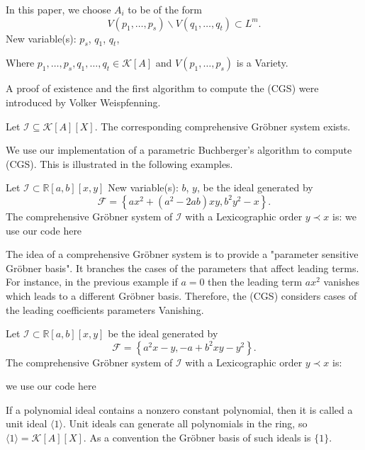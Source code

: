 \documentclass[runningheads]{llncs}
\newcommand{\1}{\chi}
\begin{document}
In this paper, we choose \(A_i\) to be of the form 
\[V(p_1,\dots,p_s)\backslash V(q_1,\dots,q_t) \subset L^m.\]
{\color{blue} New variable(s): \(p_s\), \(q_1\), \(q_t\),  }

Where \(p_1,\dots,p_s,q_1,\dots,q_t\in \mathcal{K}[A]\) and \(V(p_1,\dots,p_s)\) is a Variety.

A proof of existence and the first algorithm to compute the (CGS) were introduced by Volker Weispfenning.
\begin{theorem}
    Let \(\mathcal{I}\subseteq\mathcal{K}[A][X].\) The corresponding comprehensive Gr{\"o}bner system exists.\cite{weispfenning}
\end{theorem}
We use our implementation of a parametric Buchberger's algorithm to compute (CGS). 
This is illustrated in the following examples.
\begin{example}
    Let \(\mathcal{I}\subset \mathbb{R}[a,b][x,y]\)
{\color{blue} New variable(s): \(b\), \(y\),  }
 be the ideal generated by 
    \[\mathcal{F}=\left\{a x^2+\left(a^2-2 a b\right) x y, b^2 y^2-x\right\}.\]
    The comprehensive Gr{\"o}bner system of \(\mathcal{I}\) with a Lexicographic order \(y\prec x\) is:
    {\color{red} we use our code here}
\end{example}
The idea of a comprehensive Gr{\"o}bner system is to provide a "parameter sensitive Gr{\"o}bner basis".
It branches the cases of the parameters that affect leading terms. For instance, in the previous
example if \(a=0\) then the leading term \(a x^2\) vanishes which leads to a different Gr{\"o}bner basis. Therefore,
the (CGS) considers cases of the leading coefficients parameters Vanishing.

\begin{example}
    Let \(\mathcal{I}\subset \mathbb{R}[a,b][x,y]\) be the ideal generated by 
    \[\mathcal{F}=\left\{a^2 x-y,-a+b^2 x
    y-y^2\right\}.\]
    The comprehensive Gr{\"o}bner system of \(\mathcal{I}\) with a Lexicographic order \(y\prec x\) is:
    
    {\color{red} we use our code here}
\end{example}

\begin{remark}
    If a polynomial ideal contains a nonzero constant polynomial, then it is called a unit ideal \(\langle 1\rangle\).
   Unit ideals can generate all polynomials in the ring, so \(\langle 1\rangle=\mathcal{K}[A][X]\).
    As a convention the Gr{\"o}bner basis of such ideals is \(\{1\}\).
\end{remark}
   
\end{document}
